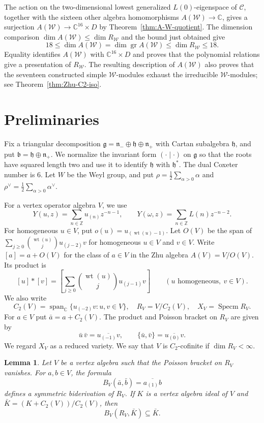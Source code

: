 \documentclass[11pt]{amsart}
\numberwithin{equation}{section}
\newtheorem{lemma}[theorem]{Lemma}
\theoremstyle{definition}
\theoremstyle{remark}
\newcommand{\CC}{\mathbb C}
\newcommand{\ZZ}{\mathbb Z}
\newcommand{\g}{\mathfrak g}
\newcommand{\h}{\mathfrak h}
\newcommand{\bfr}{\mathfrak b}
\newcommand{\nplus}{\mathfrak n_+}
\newcommand{\nminus}{\mathfrak n_-}
\newcommand{\Specm}{\operatorname{Specm}}
\newcommand{\wt}{\operatorname{wt}}
\begin{document}
The action on the two-dimensional lowest
generalized $L(0)$-eigenspace of $\mathcal C$, together with the
sixteen other algebra homomorphisms
$A(\mathcal W)\longrightarrow\CC$, gives a surjection
$A(\mathcal W)\longrightarrow\CC^{16}\times D$ by Theorem~\ref{thm:A-W-quotient}.
The dimension comparison $\dim A(\mathcal W)\leq\dim R_{\mathcal W}$
and the bound just obtained give
\[
 18\le\dim A(\mathcal W)
 =\dim\operatorname{gr}A(\mathcal W)
 \le\dim R_{\mathcal W}\le18.
\]
Equality identifies $A(\mathcal W)$ with $\CC^{16}\times D$
and proves that the polynomial relations give a presentation of
$R_{\mathcal W}$. The resulting description of $A(\mathcal W)$
also proves that the seventeen constructed simple
$\mathcal W$-modules exhaust the irreducible
$\mathcal W$-modules; see Theorem~\ref{thm:Zhu-C2-iso}.


 

\section{Preliminaries}\label{sec:notation}

Fix a triangular decomposition $\g=\nminus\oplus\h\oplus\nplus$
with Cartan subalgebra $\h$, and put $\bfr=\h\oplus\nplus$.
We normalize the invariant form $(\cdot\mid\cdot)$ on $\g$ so that the
roots have squared length two and use it to identify $\h$ with $\h^*$.
The dual Coxeter number is $6$. Let $W$ be the Weyl group, and put
$\rho=\tfrac12\sum_{\alpha>0}\alpha$ and
$\rho^\vee=\tfrac12\sum_{\alpha>0}\alpha^\vee$.

For a vertex operator algebra $V$, we use
\[
 Y(u,z)=\sum_{n\in\ZZ}u_{(n)}z^{-n-1},\qquad
 Y(\omega,z)=\sum_{n\in\ZZ}L(n)z^{-n-2}.
\]
For homogeneous $u\in V$, put $o(u)=u_{(\wt(u)-1)}$.
Let $O(V)$ be the span of $\sum_{j\geq0}\binom{\wt(u)}j u_{(j-2)}v$
for homogeneous $u\in V$ and $v\in V$. Write $[a]=a+O(V)$ for the
class of $a\in V$ in the Zhu algebra $A(V)=V/O(V)$. Its product is
\[
 [u]*[v]=\left[\sum_{j\geq0}\binom{\wt(u)}j u_{(j-1)}v\right]
 \qquad(u\text{ homogeneous},\ v\in V).
\]
We also write
\[
 C_2(V)=\operatorname{span}_{\CC}\{u_{(-2)}v:u,v\in V\},
 \quad R_V=V/C_2(V),\quad X_V=\Specm R_V.
\]
For $a\in V$ put $\bar a=a+C_2(V)$. The product and Poisson bracket
on $R_V$ are given by
\[
 \bar u\,\bar v=\overline{u_{(-1)}v},\qquad
 \{\bar u,\bar v\}=\overline{u_{(0)}v}.
\]
We regard $X_V$ as a reduced variety.
We say that $V$ is $C_2$-cofinite if $\dim R_V<\infty$.

\begin{lemma}\label{lem:first-product}
Let $V$ be a vertex algebra such that the Poisson bracket on $R_V$
vanishes. For $a,b\in V$, the formula
\[
 B_V(\bar a,\bar b)=\overline{a_{(1)}b}
\]
defines a symmetric biderivation of $R_V$. If $K$ is a vertex algebra
ideal of $V$ and $\bar K=(K+C_2(V))/C_2(V)$, then
\[
 B_V(R_V,\bar K)\subseteq\bar K.
\]
\end{lemma}
\end{document}
